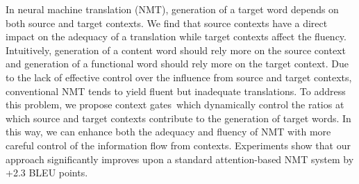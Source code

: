 In neural machine translation (NMT), generation of a target word depends on both source and target contexts. We find that source contexts have a direct impact on the adequacy of a translation while target contexts affect the fluency. Intuitively, generation of a content word should rely more on the source context and generation of a functional word should rely more on the target context. Due to the lack of effective control over the influence from source and target contexts, conventional NMT tends to yield fluent but inadequate translations. To address this problem, we propose context gates which dynamically control the ratios at which source and target contexts contribute to the generation of target words. In this way, we can enhance both the adequacy and fluency of NMT with more careful control of the information flow from contexts. Experiments show that our approach significantly improves upon a standard attention-based NMT system by +2.3 BLEU points.